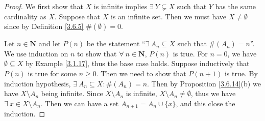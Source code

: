 \begin{proof}
    We first show that \(X\) is infinite implies \(\exists\ Y \subsetneq X\) such that \(Y\) has the same cardinality as \(X\).
    Suppose that \(X\) is an infinite set.
    Then we must have \(X \neq \emptyset\) since by Definition \ref{3.6.5} \(\#(\emptyset) = 0\).

    Let \(n \in \mathbf{N}\) and let \(P(n)\) be the statement ``\(\exists\ A_n \subseteq X\) such that \(\#(A_n) = n\)''.
    We use induction on \(n\) to show that \(\forall\ n \in \mathbf{N}\), \(P(n)\) is true.
    For \(n = 0\), we have \(\emptyset \subseteq X\) by Example \ref{3.1.17}, thus the base case holds.
    Suppose inductively that \(P(n)\) is true for some \(n \geq 0\).
    Then we need to show that \(P(n + 1)\) is true.
    By induction hypothesis, \(\exists\ A_n \subseteq X : \#(A_n) = n\).
    Then by Proposition \ref{3.6.14}(b) we have \(X \setminus A_n\) being infinite.
    Since \(X \setminus A_n\) is infinite, \(X \setminus A_n \neq \emptyset\), thus we have \(\exists\ x \in X \setminus A_n\).
    Then we can have a set \(A_{n + 1} = A_n \cup \{x\}\), and this close the induction.


\end{proof}
